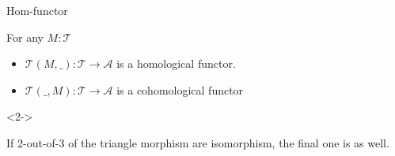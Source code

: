 \documentclass{beamer}
\begin{document}
            \begin{frame}{Hom-functor}
                \begin{lemma}
                    For any $M:\mathcal{T}$
                    \begin{itemize}
                        \item $\mathcal{T}(M,\_):\mathcal{T}\rightarrow\mathcal{A}$ is a homological functor.
                        \item $\mathcal{T}(\_,M):\mathcal{T}\rightarrow\mathcal{A}$ is a cohomological functor
                    \end{itemize}
                \end{lemma}
                \begin{onlyenv}<2->
                    \begin{lemma}
                        If 2-out-of-3 of the triangle morphism are isomorphism, the final one is as well.
                        \begin{center}
                        \end{center}
                    \end{lemma}
                \end{onlyenv}
                
            \end{frame}
\end{document}
